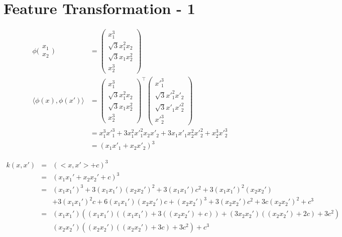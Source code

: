 \section*{Feature Transformation - 1} 

\begin{align}
	\phi \Bigg( \begin{matrix}
		x_1 \\ x_2
	\end{matrix} \Bigg) &= \begin{pmatrix}
		x_1^3 \\ \sqrt{3} x_1^2 x_2 \\ \sqrt{3} x_1 x_2^2 \\ x_2^3
	\end{pmatrix} \\
	\langle \phi(x), \phi(x') \rangle &= \begin{pmatrix}
		x_1^3 \\ \sqrt{3} x_1^2 x_2 \\ \sqrt{3} x_1 x_2^2 \\ x_2^3
	\end{pmatrix}^\top
 	\begin{pmatrix}
			{x'}_{1}^{3} \\ \sqrt{3} {x'}_1^2 x'_2 \\ \sqrt{3} {x'}_1 {x'}_2^2 \\ {x'}_2^3
	\end{pmatrix}\\
		&= x_1^3 {x'}_1^3 + 3x_1^2 {x'}_1^2 x_2 {x'}_2 + 3x_1 {x'}_1 x_2^2 {x'}_2^2 + x_2^3 {x'}_2^3\\
		&= (x_1 {x'}_1 + x_2 {x'}_2)^3
\end{align}



\begin{eqnarray}
    k(x,x')&=&\left(<x,x'> + c \right)^3 \\
    &=&\left(x_1x_1'+x_2x_2'+ c \right)^3 \\
    &=&(x_1x_1')^3 + 3(x_1x_1')(x_2x_2')^2 + 3(x_1x_1')c^2 + 3(x_1x_1')^2(x_2x_2')  \\ \nonumber
    && + 3(x_1x_1')^2c  + 6(x_1x_1')(x_2x_2')c + (x_2x_2')^3 + 3 (x_2x_2')c^2 + 3 c (x_2x_2')^2 + c^3\\
    &=& (x_1x_1')((x_1x_1')((x_1x_1') + 3((x_2x_2') + c)) + (3x_2x_2')((x_2x_2') + 2c) + 3c^2)  \\ \nonumber
    && (x_2x_2')((x_2x_2')((x_2x_2') + 3 c)+ 3c^2) + c^3
\end{eqnarray}